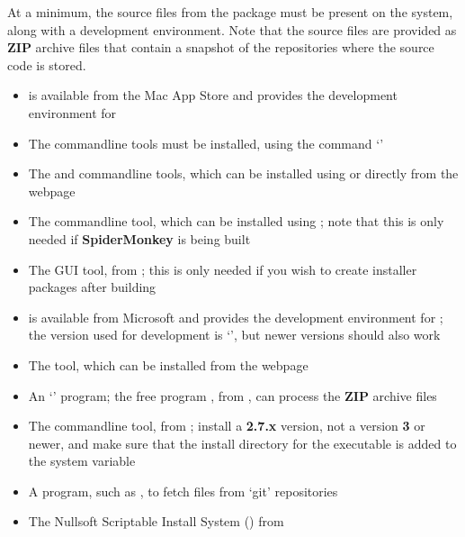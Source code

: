 At a minimum, the source files from the  package must be present on the
system, along with a  development environment.
Note that the source files are provided as \textbf{ZIP} archive files that contain a
snapshot of the  repositories where the source code is stored.
\tertiaryEnd
{}
\begin{itemize}
\item {} is available from the Mac App Store and provides the
 development environment for \osx{}
\item\exSp{}The  command\longDash{}line tools must be installed, using the
command `'
\item\exSp{}The  and  command\longDash{}line tools, which
can be installed using  or directly from the web\longDash{}page
\item\exSp{}The  command\longDash{}line tool, which can be installed
using ; note that this is only needed if \textbf{SpiderMonkey} is being
built
\item\exSp{}The  GUI tool, from
;
this is only needed if you wish to create installer packages after building \mplusm
\end{itemize}
\tertiaryEnd
{}
\begin{itemize}
\item {} is available from Microsoft and provides the 
development environment for \win; the version used for development is
`', but newer versions should also work
\item\exSp{}The  tool, which can be installed from the web\longDash{}page
\item\exSp{}An `' program; the free program , from
, can process the \textbf{ZIP} archive files
\item\exSp{}The  command\longDash{}line tool, from
; install a \textbf{2.7.x}
version, not a version \textbf{3} or newer, and make sure that the install directory for
the executable is added to the system  variable
\item\exSp{}A program, such as , to fetch files from `git' repositories
\item\exSp{}The Nullsoft Scriptable Install System () from
\end{itemize}
